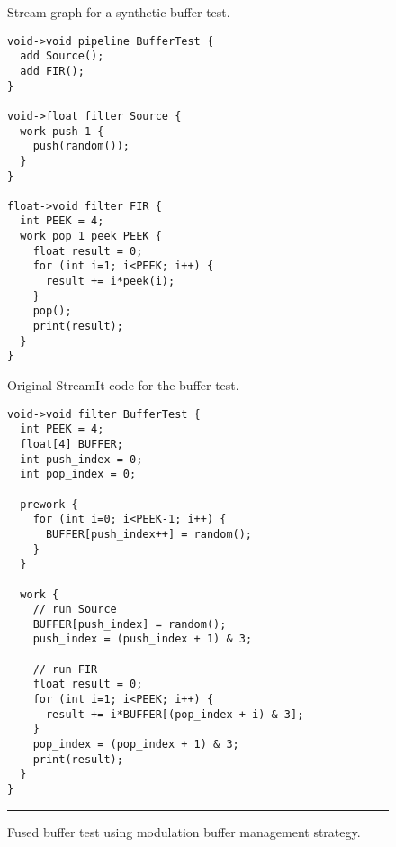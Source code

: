 \begin{figure*}[t]
\begin{minipage}{1.7in}
\centering
{}

\caption{Stream graph for a synthetic buffer test.\protect\label{fig:code-graph}}
\end{minipage}
\hspace{0.3in}
\begin{minipage}{2.2in}
\centering
{\scriptsize
\begin{verbatim}
void->void pipeline BufferTest {
  add Source();
  add FIR();
}

void->float filter Source {
  work push 1 {
    push(random());
  }
}

float->void filter FIR {
  int PEEK = 4;
  work pop 1 peek PEEK {
    float result = 0;
    for (int i=1; i<PEEK; i++) {
      result += i*peek(i);
    }
    pop();
    print(result);
  }
}
\end{verbatim}}

\caption{Original StreamIt code for the buffer test.\protect\label{fig:code-orig}}
\end{minipage}
\hspace{0.3in}
%
\begin{minipage}{2.2in}
\centering
{\scriptsize
\begin{verbatim}
void->void filter BufferTest {
  int PEEK = 4;
  float[4] BUFFER;
  int push_index = 0;
  int pop_index = 0;

  prework {
    for (int i=0; i<PEEK-1; i++) {
      BUFFER[push_index++] = random();
    }
  }

  work {
    // run Source
    BUFFER[push_index] = random();
    push_index = (push_index + 1) & 3;
    
    // run FIR
    float result = 0;
    for (int i=1; i<PEEK; i++) {
      result += i*BUFFER[(pop_index + i) & 3];
    }
    pop_index = (pop_index + 1) & 3;
    print(result);
  }
}
\end{verbatim}}

\caption{Fused buffer test using modulation buffer management strategy.\protect\label{fig:code-modulation}}
\end{minipage}
\vspace{6pt}
\hrule
\vspace{6pt}
\end{figure*}
